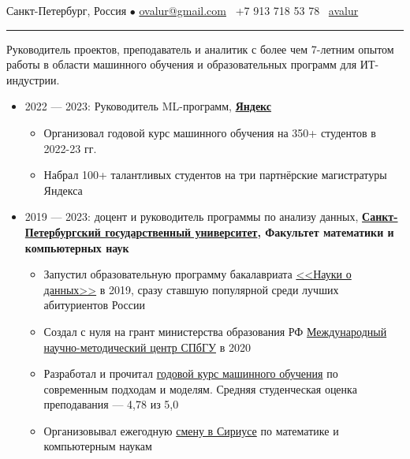 \documentclass[11pt]{article}
\begin{document}
%

\vspace{0.5em}

\noindent Санкт-Петербург, Россия $\bullet$ \href{mailto:ovalur@gmail.com}{ovalur@gmail.com} \faMobile~+7 913 718 53 78
\faGithub~\href{https://github.com/avalur}{avalur}

\vspace{0.5em}
\hrule
\vspace{0.5em}

Руководитель проектов, преподаватель и аналитик с более чем 7-летним опытом работы в области машинного обучения и образовательных программ для ИТ-индустрии.

\vspace{0.5em}
\begin{itemize}
	\item 2022 — 2023:
	Руководитель ML-программ, \textbf{\href{https://yandex.ru}{Яндекс}}
	\begin{itemize}
		\item Организовал годовой курс машинного обучения на 350+ студентов в 2022-23 гг.
		\item Набрал 100+ талантливых студентов на три партнёрские магистратуры Яндекса
	\end{itemize}

	\item 2019 — 2023: доцент и руководитель программы по анализу данных, \textbf{\href{https://spbu.ru}{Санкт-Петербургский государственный университет}, Факультет математики и компьютерных наук}

	\begin{itemize}
		\item Запустил образовательную программу бакалавриата \href{https://maad.compscicenter.ru}{<<Науки о данных>>} в 2019, сразу ставшую популярной среди лучших абитуриентов России
		\item Создал с нуля на грант министерства образования РФ \href{https://gsom.spbu.ru/all_news/event2020-11-28/}{Международный научно-методический центр СПбГУ} в 2020
		\item Разработал и прочитал \href{https://github.com/spbu-math-cs/ml-course/}{годовой курс машинного обучения} 
		по современным подходам и моделям. Средняя студенческая оценка преподавания — 4,78 из 5,0
		\item Организовывал ежегодную \href{https://sochisirius.ru/obuchenie/nauka/smena1078/5204}{смену в Сириусе} по математике и компьютерным наукам
	\end{itemize}


\end{itemize}
\end{document}
